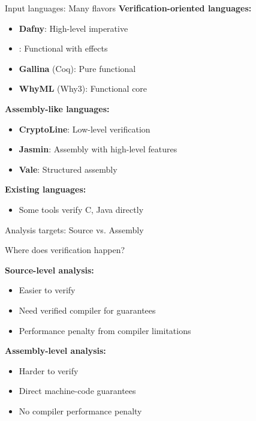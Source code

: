 \documentclass[aspectratio=169, lualatex, handout]{beamer}
\begin{document}
\begin{frame}{Input languages: Many flavors}
	\textbf{Verification-oriented languages:}
	\begin{itemize}
		\item \textbf{Dafny}: High-level imperative
		\item \textbf{\fstar}: Functional with effects
		\item \textbf{Gallina} (Coq): Pure functional
		\item \textbf{WhyML} (Why3): Functional core
	\end{itemize}
	\vspace{0.5em}
	\textbf{Assembly-like languages:}
	\begin{itemize}
		\item \textbf{CryptoLine}: Low-level verification
		\item \textbf{Jasmin}: Assembly with high-level features
		\item \textbf{Vale}: Structured assembly
	\end{itemize}
	\vspace{0.5em}
	\textbf{Existing languages:}
	\begin{itemize}
		\item Some tools verify C, Java directly
	\end{itemize}
\end{frame}

\begin{frame}{Analysis targets: Source vs. Assembly}
	\begin{center}
		\Large
		Where does verification happen?
	\end{center}
	\vspace{1em}
	\textbf{Source-level analysis:}
	\begin{itemize}
		\item Easier to verify
		\item Need verified compiler for guarantees
		\item Performance penalty from compiler limitations
	\end{itemize}
	\vspace{0.5em}
	\textbf{Assembly-level analysis:}
	\begin{itemize}
		\item Harder to verify
		\item Direct machine-code guarantees
		\item No compiler performance penalty
	\end{itemize}
\end{frame}
\end{document}
